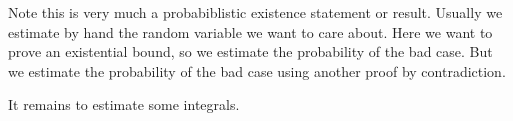 Note this is very much a probabiblistic existence statement or result. %
Usually we estimate by hand the random variable we want to care about. Here we want to prove an existential bound, so we estimate the probability of the bad case. But we estimate the probability of the bad case using another proof by contradiction.

It remains to estimate some integrals. 





